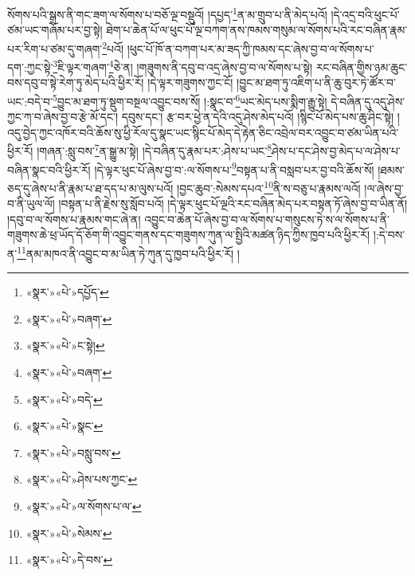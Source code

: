 སོགས་པའི་སྒྲས་ནི་གང་ཟག་ལ་སོགས་པ་བཅོ་ལྔ་བསྡུའོ། །དཔྱད་\footnote{«སྣར་»«པེ་»དཔྱོད་}ན་མ་གྲུབ་པ་ནི་མེད་པའོ། །དེ་འདྲ་བའི་ཕུང་པོ་ཙམ་ཡང་གཞོམ་པར་བྱ་སྟེ། ཐེག་པ་ཆེན་པོ་ལ་ཕུང་པོ་ལྔ་བཀག་ནས་ཁམས་གསུམ་ལ་སོགས་པའི་རང་བཞིན་རྣམ་པར་རིག་པ་ཙམ་དུ་གཞག་\footnote{«སྣར་»«པེ་»བཞག་}པའོ། །ཕུང་པོ་ཁོ་ན་བཀག་པར་མ་ཟད་ཀྱི་ཁམས་དང་ཞེས་བྱ་བ་ལ་སོགས་པ་དག་:ཀྱང་སྟེ་\footnote{«སྣར་»«པེ་»ང་སྟེ། }ཇི་ལྟར་གཞག་\footnote{«སྣར་»«པེ་»བཞག་}ཅེ་ན། །གཟུགས་ནི་དབུ་བ་འདྲ་ཞེས་བྱ་བ་ལ་སོགས་པ་སྟེ། རང་བཞིན་གྱིས་ཉམ་ཆུང་བས་དབུ་བ་སྟེ་རེག་ཏུ་མེད་པའི་ཕྱིར་རོ། །དེ་ལྟར་གཟུགས་ཀྱང་ངོ། །བྱུང་མ་ཐག་ཏུ་འཇིག་པ་ནི་ཆུ་བུར་ཏེ་ཚོར་བ་ཡང་:བདེ་བ་\footnote{«སྣར་»«པེ་»བདེ་}བྱུང་མ་ཐག་ཏུ་སྡུག་བསྔལ་འབྱུང་བས་སོ། །:སྣང་བ་\footnote{«སྣར་»«པེ་»སྣང་}ཡང་མེད་པས་སྨིག་རྒྱུ་སྟེ། དེ་བཞིན་དུ་འདུ་ཤེས་ཀྱང་ཀ་བ་ཞེས་བྱ་བ་རྩེ་མོ་དང་། དབུས་དང་། རྩ་བར་ཕྱེ་ན་དེའི་འདུ་ཤེས་མེད་པའོ། །སྙིང་པོ་མེད་པས་ཆུ་ཤིང་སྟེ། །འདུ་བྱེད་ཀྱང་འཁོར་བའི་ཆོས་སུ་ཕྱི་རོལ་དུ་སྣང་ཡང་སྙིང་པོ་མེད་དེ་རྟེན་ཅིང་འབྲེལ་བར་འབྱུང་བ་ཙམ་ཡིན་པའི་ཕྱིར་རོ། །གཞན་:སླུ་བས་\footnote{«སྣར་»«པེ་»བསླུ་བས་}ན་སྒྱུ་མ་སྟེ། །དེ་བཞིན་དུ་རྣམ་པར་:ཤེས་པ་ཡང་\footnote{«སྣར་»«པེ་»ཤེས་པས་ཀྱང་}ཤེས་པ་དང་ཤེས་བྱ་མེད་པ་ལ་ཤེས་པ་བཞིན་སྣང་བའི་ཕྱིར་རོ། །དེ་ལྟར་ཕུང་པོ་ཞེས་བྱ་བ་:ལ་སོགས་པ་\footnote{«སྣར་»«པེ་»ལ་སོགས་པ་ལ་}བསྟན་པ་ནི་བསླབ་པར་བྱ་བའི་ཆོས་སོ། །ཐམས་ཅད་དུ་ཞེས་པ་ནི་རྣམ་པ་ཐ་དད་པ་མ་ལུས་པའོ། །བྱང་ཆུབ་:སེམས་དཔའ་\footnote{«སྣར་»«པེ་»སེམས་}ནི་ས་བཅུ་པ་རྣམས་ལའོ། །ལ་ཞེས་བྱ་བ་ནི་ཡུལ་ལོ། །བསྟན་པ་ནི་རྗེས་སུ་སློབ་པའོ། །དེ་ལྟར་ཕུང་པོ་ལྔའི་རང་བཞིན་མེད་པར་བསྟན་ཏོ་ཞེས་བྱ་བ་ཡིན་ནོ། །དབུ་བ་ལ་སོགས་པ་རྣམས་གང་ཞེ་ན། འབྱུང་བ་ཆེན་པོ་ཞེས་བྱ་བ་ལ་སོགས་པ་གསུངས་ཏེ་ས་ལ་སོགས་པ་ནི་གཟུགས་ཆེ་ཕྲ་ཡོད་དོ་ཅོག་གི་འབྱུང་གནས་དང་གཟུགས་ཀུན་ལ་སྤྱིའི་མཚན་ཉིད་ཀྱིས་ཁྱབ་པའི་ཕྱིར་རོ། །:དེ་བས་ན་\footnote{«སྣར་»«པེ་»དེ་བས་}ནམ་མཁའ་ནི་འབྱུང་བ་མ་ཡིན་ཏེ་ཀུན་དུ་ཁྱབ་པའི་ཕྱིར་རོ། །
